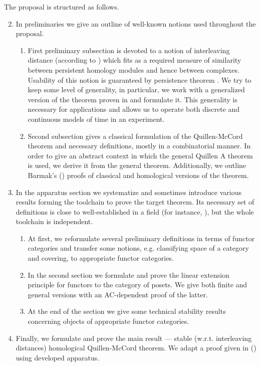 \documentclass[a4paper, 12pt]{article}
\numberwithin{equation}{section}
\theoremstyle{definition}
\theoremstyle{remark}
\begin{document}
The proposal is structured as follows.
\begin{enumerate}
  \setcounter{enumi}{1}
  \item In preliminaries we give an outline of well-known notions used throughout the proposal.
  \begin{enumerate}[label*=\arabic*.]
    \item First preliminary subsection is devoted to a notion of interleaving distance (according to {\cite{GS16}}) which fits as a required measure of similarity between persistent homology modules and hence between complexes. Usability of this notion is guaranteed by persistence theorem {\cite{Zomorodian05}}. We try to keep some level of generality, in particular, we work with a generalized version of the theorem proven in {\cite{Corbet18}} and formulate it. This generality is necessary for applications and allows us to operate both discrete and continuous models of time in an experiment.
    \item Second subsection gives a classical formulation of the Quillen-McCord theorem and necessary definitions, mostly in a combinatorial manner. In order to give an abstract context in which the general Quillen A theorem {\cite{Quillen72}} is used, we derive it from the general theorem. Additionally, we outline Barmak's ({\cite{Bar11}}) proofs of classical and homological versions of the theorem.
  \end{enumerate}
  \item In the apparatus section we systematize and sometimes introduce various results forming the toolchain to prove the target theorem. Its necessary set of definitions is close to well-established in a field (for instance, {\cite{Bubenik15}}), but the whole toolchain is independent.
  \begin{enumerate}[label*=\arabic*.]
    \item At first, we reformulate several preliminary definitions in terms of functor categories and transfer some notions, e.g. classifying space of a category and covering, to appropriate functor categories.
    \item In the second section we formulate and prove the linear extension principle for functors to the category of posets. We give both finite and general versions with an AC-dependent proof of the latter.
    \item At the end of the section we give some technical stability results concerning objects of appropriate functor categories.
  \end{enumerate}
  \item Finally, we formulate and prove the main result --- stable (w.r.t. interleaving distances) homological Quillen-McCord theorem. We adapt a proof given in ({\cite{Bar11}}) using developed apparatus.
\end{enumerate}
\end{document}
